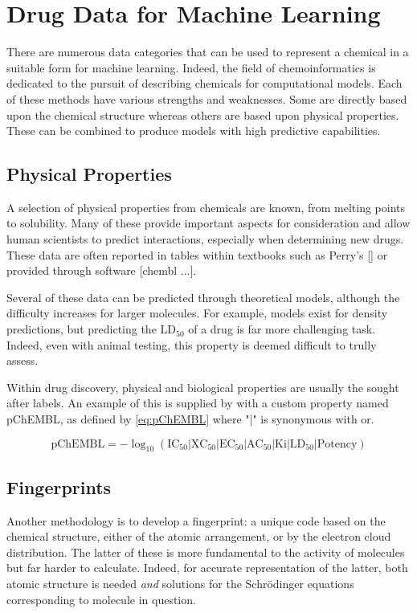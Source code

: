 \section{Drug Data for Machine Learning}
There are numerous data categories that can be used to represent a chemical in a suitable form for machine learning. Indeed, the field of chemoinformatics is dedicated to the pursuit of describing chemicals for computational models. Each of these methods have various strengths and weaknesses. Some are directly based upon the chemical structure whereas others are based upon physical properties. These can be combined to produce models with high predictive capabilities.

\subsection{Physical Properties}
A selection of physical properties from chemicals are known, from melting points to solubility. Many of these provide important aspects for consideration and allow human scientists to predict interactions, especially when determining new drugs. These data are often reported in tables within textbooks such as Perry's [] or provided through software [chembl ...].

Several of these data can be predicted through theoretical models, although the difficulty increases for larger molecules. For example, models exist for density predictions, but predicting the $\mathrm{LD_{50}}$ of a drug is  far more challenging task. Indeed, even with animal testing, this property is deemed difficult to trully assess.

Within drug discovery, physical and biological properties are usually the sought after labels. An example of this is supplied by \textcite{CHEMBL} with a custom property named pChEMBL, as defined by \ref{eq:pChEMBL} where  "|" is synonymous with or.

\begin{equation}
  \label{eq:pChEMBL}
  \mathrm{pChEMBL}=-\log_{10}{\left(\mathrm{IC_{50}}|\mathrm{XC_{50}}|\mathrm{EC_{50}}|\mathrm{AC_{50}}|\mathrm{Ki}|\mathrm{LD_{50}}|\mathrm{Potency}\right)}
\end{equation}

\subsection{Fingerprints}
Another methodology is to develop a fingerprint: a unique code based on the chemical structure, either of the atomic arrangement, or by the electron cloud distribution. The latter of these is more fundamental to the activity of molecules but far harder to calculate. Indeed, for accurate representation of the latter, both atomic structure is needed \textit{and} solutions for the Schrödinger equations corresponding to molecule in question.

